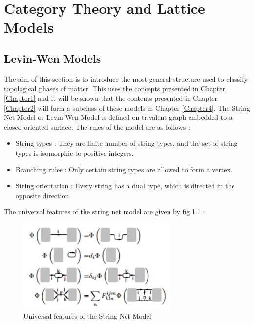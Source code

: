 
\chapter{Category Theory and Lattice Models} %

\label{Chapter3} %



\section{Levin-Wen Models}
    The aim of this section is to introduce the most general structure used to classify topological phases of matter. This uses the concepts presented in Chapter
\ref{Chapter1} and it will be shown that the contents presented in Chapter \ref{Chapter2} will form a subclass of these models in Chapter \ref{Chapter4}. The String Net Model
or Levin-Wen Model \citep{Reference3} is defined on trivalent graph embedded to a closed oriented surface. The rules of the model are as follows : \\

\begin{itemize}
\item[1] String types : They are finite number of string types, and the set of string types is isomorphic to positive integers.\\
\item[2] Branching rules : Only certain string types are allowed to form a  vertex.\\
\item[3] String orientation : Every string has a dual type, which is directed in the opposite direction.
\end{itemize}

The universal features of the string net model are given by fig \ref{fig:Levin_Wen_features} :
\begin{figure}
  \centering
      \includegraphics[width=8cm]{Levin_Wen_conditions.pdf}
      \caption[Features of Levin-Wen Model]{Universal features of the String-Net Model}
  \centering    
  \label{fig:Levin_Wen_features}
\end{figure}

